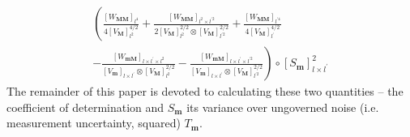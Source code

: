 \documentclass[preprint,12pt]{elsarticle}
\newcommand*{\x}{\times}
\newcommand*{\mi}[1]{\mathbf{#1}}
\newcommand*{\te}[2][]{\left\lbrack{#2}\right\rbrack_{#1}}
\begin{document}
    \begin{multline}\label{eq:GSI:correction}
        \left(
            \frac{\te[l^{4}]{W_\mi{MM}}}{4\te[l^{2}]{V_\mi{M}}^{4/2}} + 
            \frac{\te[l^{2}\x l^{\prime 2}]{W_\mi{MM}}}{2\te[l^{2}]{V_\mi{M}}^{2/2} \otimes \te[l^{\prime 2}]{V_\mi{M}}^{2/2}} + 
            \frac{\te[l^{\prime 4}]{W_\mi{MM}}}{4\te[l^{\prime}]{V_\mi{M}}^{4/2}} \right. \\
        \left. 
            -\frac{\te[l\x l^{\prime}\x l^{2}]{W_\mi{mM}}}{\te[l\x l^{\prime}]{V_\mi{m}} \otimes \te[l^{2}]{V_\mi{M}}^{2/2}}
            -\frac{\te[l\x l^{\prime}\x l^{\prime 2}]{W_\mi{mM}}}{\te[l\x l^{\prime}]{V_\mi{m}} \otimes \te[l^{\prime 2}]{V_\mi{M}}^{2/2}} \right) \circ \te[l\x l^{\prime}]{S_{\mi{m}}}^{2}
    \end{multline}
    The remainder of this paper is devoted to calculating these two quantities -- the coefficient of determination and $S_{\mi{m}}$ its variance over ungoverned noise (i.e. measurement uncertainty, squared) $T_{\mi{m}}$.
\end{document}
